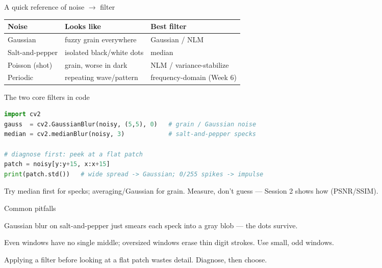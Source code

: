 \documentclass[10pt,aspectratio=169]{beamer}
\begin{document}
\begin{frame}{A quick reference of noise $\rightarrow$ filter}
  \begin{center}
  \begin{tabular}{@{}lll@{}}
    \toprule
    \textbf{Noise} & \textbf{Looks like} & \textbf{Best filter} \\
    \midrule
    Gaussian & fuzzy grain everywhere & Gaussian / NLM \\
    Salt-and-pepper & isolated black/white dots & median \\
    Poisson (shot) & grain, worse in dark & NLM / variance-stabilize \\
    Periodic & repeating wave/pattern & frequency-domain (Week 6) \\
    \bottomrule
  \end{tabular}
  \end{center}
\end{frame}

\begin{frame}[fragile]{The two core filters in code}
\begin{lstlisting}[language=Python]
import cv2
gauss  = cv2.GaussianBlur(noisy, (5,5), 0)   # grain / Gaussian noise
median = cv2.medianBlur(noisy, 3)            # salt-and-pepper specks

# diagnose first: peek at a flat patch
patch = noisy[y:y+15, x:x+15]
print(patch.std())   # wide spread -> Gaussian; 0/255 spikes -> impulse
\end{lstlisting}
  \begin{infobox}
    Try median first for specks; averaging/Gaussian for grain. Measure, don't guess — Session 2 shows how (PSNR/SSIM).
  \end{infobox}
\end{frame}

\begin{frame}{Common pitfalls}
  \begin{badbox}
    Gaussian blur on salt-and-pepper just smears each speck into a gray blob — the dots survive.
  \end{badbox}
  \begin{badbox}
    Even windows have no single middle; oversized windows erase thin digit strokes. Use small, odd windows.
  \end{badbox}
  \begin{badbox}
    Applying a filter before looking at a flat patch wastes detail. Diagnose, then choose.
  \end{badbox}
\end{frame}
\end{document}
